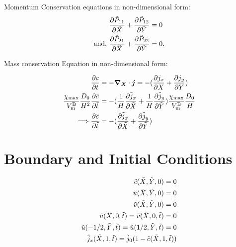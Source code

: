 \documentclass[../main.tex]{subfiles}
\begin{document}
Momentum Conservation equations in non-dimensional form:
\begin{align}
    \pdiff{\tP{11}}{\tX} + \pdiff{\tP{12}}{\tY} &= 0 \\
    \text{and, }   \pdiff{\tP{21}}{\tX} +  \pdiff{\tP{22}}{\tY} &= 0.
\end{align}


Mass conservation Equation in non-dimensional form:

\begin{align}
    \pdiff{c}{t} &= - \nablaX \cdot \bm{j} = -(\pdiff{j_x}{X} + \pdiff{j_y}{ Y}) \\
    \cmax \fc{D_0}{H^2} \pdiff{{\td{c}}}{\tt}  &= -(\fc{1}{H}\pdiff{ \td{j}_x}{\tX} + \fc{1}{H}\pdiff{ \td{j}_y}{\tY})\cmax \fc{D_0}{H} \\
    \Longrightarrow  \pdiff{{\tc}}{\tt}  &= - (\pdiff{ \td{j}_x}{\tX} +  \pdiff{ \td{j}_y}{\tY}) 
\end{align}

\section{Boundary and Initial Conditions}
\begin{align}
    \tc(\tX, \tY, 0) = 0 \\
    \tu(\tX, \tY, 0) = 0 \\
    \tv(\tX, \tY, 0) = 0 \\
    \tu(\tX, 0, \tt) = \tv(\tX, 0, \tt) = 0 \\
    \tu(-1/2, \tY, \tt) =  \tu(1/2, \tY, \tt) = 0 \\
    \td{j}_x(\tX, 1, \tt) = \td{j}_0 (1 - \tc(\tX, 1, \tt))
\end{align} 


\end{document}
